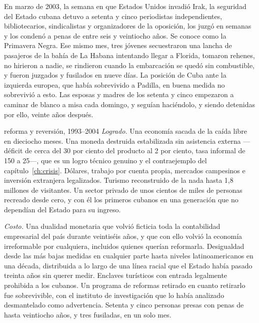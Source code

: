 En marzo de 2003, la semana en que Estados Unidos invadió Irak, la seguridad del
Estado cubana detuvo a setenta y cinco periodistas independientes, bibliotecarios,
sindicalistas y organizadores de la oposición, los juzgó en semanas y los condenó
a penas de entre seis y veintiocho años. Se conoce como la Primavera Negra. Ese
mismo mes, tres jóvenes secuestraron una lancha de pasajeros de la bahía de La
Habana intentando llegar a Florida, tomaron rehenes, no hirieron a nadie, se
rindieron cuando la embarcación se quedó sin combustible, y fueron juzgados y
fusilados en nueve días. La posición de Cuba ante la izquierda europea, que había
sobrevivido a Padilla, en buena medida no sobrevivió a esto. Las esposas y madres
de los setenta y cinco empezaron a caminar de blanco a misa cada domingo, y
seguían haciéndolo, y siendo detenidas por ello, veinte años después.

\begin{ledger}{reforma y reversión, 1993--2004}
\emph{Logrado.} Una economía sacada de la caída libre en dieciocho meses. Una
moneda destruida estabilizada sin asistencia externa ---déficit de cerca del 30
por ciento del producto al 2 por ciento, tasa informal de 150 a 25---, que es un
logro técnico genuino y el contraejemplo del capítulo~\ref{ch:crisis}. Dólares,
trabajo por cuenta propia, mercados campesinos e inversión extranjera legalizados.
Turismo reconstruido de la nada hasta 1,8 millones de visitantes. Un sector
privado de unos cientos de miles de personas recreado desde cero, y con él los
primeros cubanos en una generación que no dependían del Estado para su ingreso.

\emph{Costo.} Una dualidad monetaria que volvió ficticia toda la contabilidad
empresarial del país durante veintiséis años, y que con ello volvió la economía
irreformable por cualquiera, incluidos quienes querían reformarla. Desigualdad
desde las más bajas medidas en cualquier parte hasta niveles latinoamericanos en
una década, distribuida a lo largo de una línea racial que el Estado había pasado
treinta años sin querer medir. Enclaves turísticos con entrada legalmente
prohibida a los cubanos. Un programa de reformas retirado en cuanto retirarlo fue
sobrevivible, con el instituto de investigación que lo había analizado
desmantelado como advertencia. Setenta y cinco personas presas con penas de hasta
veintiocho años, y tres fusiladas, en un solo mes.
\end{ledger}

